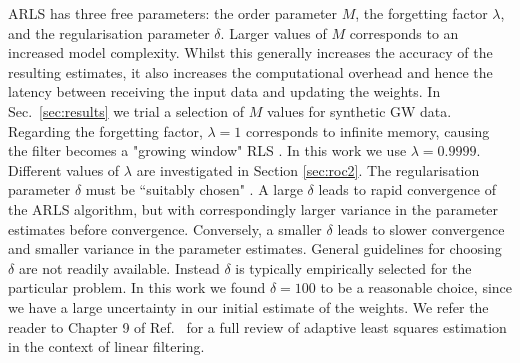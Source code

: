 \documentclass[pra,superscriptaddress,reprint,amsmath,amssymb,nofootinbib]{revtex4-2}
\begin{document}
ARLS has three free parameters: the order parameter $M$, the forgetting factor $\lambda$, and the regularisation parameter $\delta$. Larger values of $M$ corresponds to an increased model complexity. Whilst this generally increases the accuracy of the resulting estimates, it also increases the computational overhead and hence the latency between receiving the input data and updating the weights. In Sec.~\ref{sec:results} we trial a selection of $M$ values for synthetic GW data. Regarding the forgetting factor,  $\lambda=1$ corresponds to infinite memory, causing the filter becomes a "growing window" RLS \citep{10.5555/547203,10.5555/560138}. In this work we use $\lambda=0.9999$. Different values of $\lambda$ are investigated in Section \ref{sec:roc2}. The regularisation parameter $\delta$ must be ``suitably chosen" \citep{ljung1999system,1989system}. A large $\delta$ leads to rapid convergence of the ARLS algorithm, but with correspondingly larger variance in the parameter estimates before convergence. Conversely, a smaller $\delta$ leads to slower convergence and smaller variance in the parameter estimates. General guidelines for choosing $\delta$ are not readily available. Instead $\delta$ is typically empirically selected for the particular problem. In this work we found $\delta = 100$ to be a reasonable choice, since we have a large uncertainty in our initial estimate of the weights. We refer the reader to Chapter 9 of Ref.~\cite{HaykinAdaptiveFT:2002} for a full review of adaptive least squares estimation in the context of linear filtering. 
\end{document}
